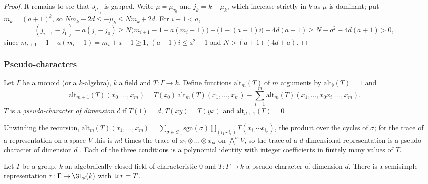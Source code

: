 \begin{proof}
It remains to see that $J_{\mu_{\tau_0}}$ is gapped. Write $\mu=\mu_{\tau_0}$ and $j_k=k-\mu_k$, which increase strictly in
$k$ as $\mu$ is dominant; put $m_k=(a+1)^k$, so $Nm_k-2d\le-\mu_k\le Nm_k+2d$. For $i+1<a$,
\[
  (j_{i+1}-j_0)-a(j_i-j_0)\ge N\bigl(m_{i+1}-1-a(m_i-1)\bigr)+\bigl(1-(a-1)i\bigr)-4d(a+1)\ge N-a^2-4d(a+1)>0,
\]
since $m_{i+1}-1-a(m_i-1)=m_i+a-1\ge1$, $(a-1)i\le a^2-1$ and $N>(a+1)(4d+a)$.
\end{proof}

\subsubsection{Pseudo-characters}

\begin{definition}\label{pf:galred:pschar}
Let $\Gamma$ be a monoid (or a $k$-algebra), $k$ a field and $T\colon\Gamma\to k$. Define functions
$\mathrm{alt}_m(T)$ of $m$ arguments by $\mathrm{alt}_0(T)=1$ and
\[
  \mathrm{alt}_{m+1}(T)(x_0,\dots,x_m)=T(x_0)\,\mathrm{alt}_m(T)(x_1,\dots,x_m)
  -\sum_{i=1}^m\mathrm{alt}_m(T)(x_1,\dots,x_0x_i,\dots,x_m).
\]
$T$ is a \emph{pseudo-character of dimension $d$} if $T(1)=d$, $T(xy)=T(yx)$ and $\mathrm{alt}_{d+1}(T)=0$.
\end{definition}

Unwinding the
recursion, $\mathrm{alt}_m(T)(x_1,\dots,x_m)=\sum_{\sigma\in S_m}\mathrm{sgn}(\sigma)\prod_{(i_1\cdots i_r)}T(x_{i_1}\cdots x_{i_r})$,
the product over the cycles of $\sigma$; for the trace of a representation on a space $V$ this is $m!$ times the trace
of $x_1\otimes\dots\otimes x_m$ on $\bigwedge^mV$, so the trace of a $d$-dimensional representation is a pseudo-character
of dimension $d$ \cite{Taylor1991}. Each of the three conditions is a polynomial identity with integer coefficients in
finitely many values of $T$.

\begin{theorem}\label{pf:galred:ssrep}
Let $\Gamma$ be a group, $k$ an algebraically closed field of characteristic $0$ and $T\colon\Gamma\to k$ a
pseudo-character of dimension $d$. There is a semisimple representation $r\colon\Gamma\to\GL_d(k)$ with $\operatorname{tr} r=T$.
\end{theorem}

